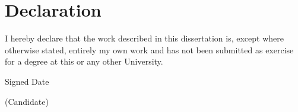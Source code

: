 \clearpage
\pagestyle{empty} 
\section*{Declaration}

I hereby declare that the work described in this dissertation is, except
where otherwise stated, entirely my own work and has not been submitted as 
exercise for a degree at this or any other University.

\vspace{3cm}

\noindent Signed \dotfill \hspace{4cm} Date \dotfill

\vspace{0.5cm}

\noindent (Candidate)

